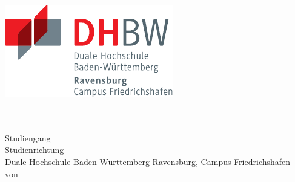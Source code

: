 \thispagestyle{plain}
\hypersetup{pageanchor=false}
\begin{titlepage}
\enlargethispage{4.0cm}
\sffamily 								%

\parbox{0.5\linewidth}{
\begin{flushleft}
\end{flushleft}
}
\parbox{0.5\linewidth}{
\begin{flushright}
	\includegraphics[width=0.4\linewidth]{images/DHBW_d_R_FN_46mm_4c}\\[5ex]
\end{flushright}
}
				

\begin{center}

{\fontsize{20.74pt}{24pt}\selectfont
\textbf{\titel}\\[1.5ex]}
{\fontsize{17pt}{20pt}\selectfont
\textbf{\arbeit}\\[2ex]}
{\fontsize{14pt}{17pt}\selectfont
Studiengang \studiengang\\[2ex]}
{\fontsize{12pt}{14pt}\selectfont
Studienrichtung \studienrichtung\\[1ex]
Duale Hochschule Baden-Württemberg Ravensburg, Campus Friedrichshafen\\[5ex]
von\\[1ex]
\autor\\[15ex]}


\end{center}


\end{titlepage}
